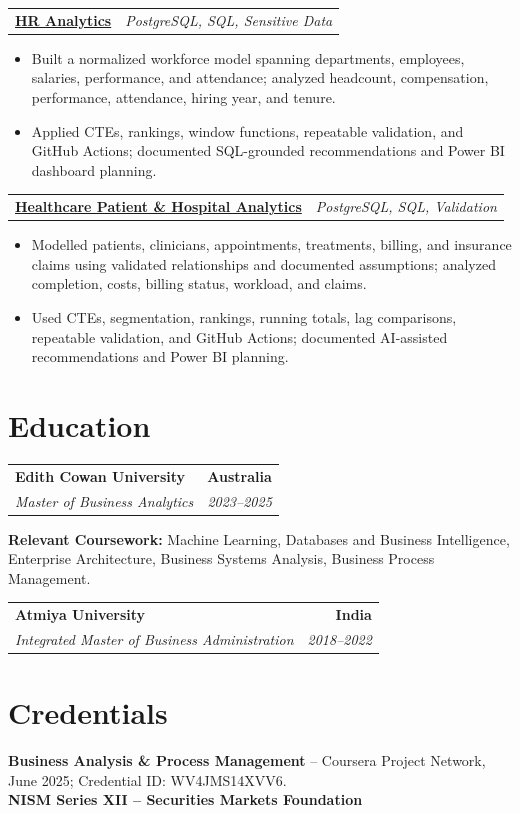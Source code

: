 \documentclass[letterpaper,10pt]{article}
\makeatletter
\newcommand{\role}[4]{%
  \begin{tabularx}{\textwidth}{@{}Xr@{}}
    \textbf{#1} & \textbf{#2} \\
    \textit{#3} & \textit{#4}
  \end{tabularx}\vspace{-1pt}
}
\newcommand{\project}[2]{%
  \begin{tabularx}{\textwidth}{@{}Xr@{}}
    \textbf{#1} & \textit{#2}
  \end{tabularx}\vspace{-1pt}
}
\makeatother
\begin{document}
\project{\href{https://github.com/jainalimehta/HR-Analytics}{HR Analytics}}{PostgreSQL, SQL, Sensitive Data}
\begin{itemize}
  \item Built a normalized workforce model spanning departments, employees, salaries, performance, and attendance; analyzed headcount, compensation, performance, attendance, hiring year, and tenure.
  \item Applied CTEs, rankings, window functions, repeatable validation, and GitHub Actions; documented SQL-grounded recommendations and Power BI dashboard planning.
\end{itemize}
\vspace{1pt}

\project{\href{https://github.com/jainalimehta/Healthcare-Analytics}{Healthcare Patient \& Hospital Analytics}}{PostgreSQL, SQL, Validation}
\begin{itemize}
  \item Modelled patients, clinicians, appointments, treatments, billing, and insurance claims using validated relationships and documented assumptions; analyzed completion, costs, billing status, workload, and claims.
  \item Used CTEs, segmentation, rankings, running totals, lag comparisons, repeatable validation, and GitHub Actions; documented AI-assisted recommendations and Power BI planning.
\end{itemize}

\section{Education}
\role{Edith Cowan University}{Australia}{Master of Business Analytics}{2023--2025}
\small\textbf{Relevant Coursework:} Machine Learning, Databases and Business Intelligence, Enterprise Architecture, Business Systems Analysis, Business Process Management.\\[2pt]
\role{Atmiya University}{India}{Integrated Master of Business Administration}{2018--2022}

\section{Credentials}
\small\textbf{Business Analysis \& Process Management} -- Coursera Project Network, June 2025; Credential ID: WV4JMS14XVV6.\\[-0.2pt]
\small\textbf{NISM Series XII -- Securities Markets Foundation}
\end{document}

